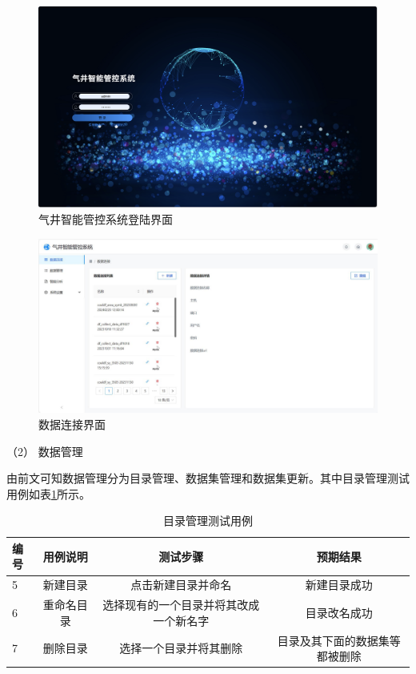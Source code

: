 \begin{figure}
    \centering
    \includegraphics{figure/login.pdf}
    \caption{气井智能管控系统登陆界面}
    \label{fig:login}
\end{figure}
\begin{figure}
    \centering
    \includegraphics{figure/数据连接.pdf}
    \caption{数据连接界面}
    \label{fig:dataconre}
\end{figure}

（2） 数据管理

由前文可知数据管理分为目录管理、数据集管理和数据集更新。其中目录管理测试用例如表\ref{tab:direte}所示。
\begin{table}
    \renewcommand{\arraystretch}{1.5}
    \centering
    \caption{目录管理测试用例}
    \label{tab:direte}
    \begin{tabular}{|l|c|c|c|}
        \hline
        编号 & 用例说明 & 测试步骤 & 预期结果 \\
        \hline
        5 & 新建目录 & 点击新建目录并命名 & 新建目录成功 \\
        \hline 
        6 & 重命名目录 & 选择现有的一个目录并将其改成一个新名字 & 目录改名成功 \\
        \hline
        7 & 删除目录 & 选择一个目录并将其删除 & 目录及其下面的数据集等都被删除 \\
        \hline
    \end{tabular}
\end{table}

